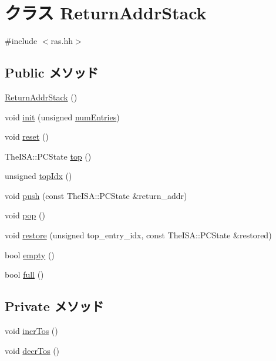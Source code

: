 \hypertarget{classReturnAddrStack}{
\section{クラス ReturnAddrStack}
\label{classReturnAddrStack}
}


{\ttfamily \#include $<$ras.hh$>$}\subsection*{Public メソッド}
\begin{DoxyCompactItemize}
\item 
\hyperlink{classReturnAddrStack_ad7c4f42a62f7c96cbbbbca39d1d3ec37}{ReturnAddrStack} ()
\item 
void \hyperlink{classReturnAddrStack_a3de058721f5a8bb18c22178bac0af88d}{init} (unsigned \hyperlink{classReturnAddrStack_a325de474a9f6652329339d9fc2ea09c0}{numEntries})
\item 
void \hyperlink{classReturnAddrStack_ad20897c5c8bd47f5d4005989bead0e55}{reset} ()
\item 
TheISA::PCState \hyperlink{classReturnAddrStack_a4ec0e8cb31b1b16c826462529549c4bf}{top} ()
\item 
unsigned \hyperlink{classReturnAddrStack_a7e8bedc8c9dd0c3b75ca2a453fe971a1}{topIdx} ()
\item 
void \hyperlink{classReturnAddrStack_a17169cc45efa4884c3af6dc4fbf95bf5}{push} (const TheISA::PCState \&return\_\-addr)
\item 
void \hyperlink{classReturnAddrStack_a312e7f6c761a199c1369fbe651e084f0}{pop} ()
\item 
void \hyperlink{classReturnAddrStack_ac208ad882bfb6aa015072a38b7816fdd}{restore} (unsigned top\_\-entry\_\-idx, const TheISA::PCState \&restored)
\item 
bool \hyperlink{classReturnAddrStack_a3f37b042a1e7cd4bd38fc564de81f0da}{empty} ()
\item 
bool \hyperlink{classReturnAddrStack_a825cad95d5a85dba2844e74f50c174a3}{full} ()
\end{DoxyCompactItemize}
\subsection*{Private メソッド}
\begin{DoxyCompactItemize}
\item 
void \hyperlink{classReturnAddrStack_a5ad6ef5933499ac13bf56455603ed00d}{incrTos} ()
\item 
void \hyperlink{classReturnAddrStack_abb9c413b66abc6c139c1a255363cc50b}{decrTos} ()
\end{DoxyCompactItemize}
